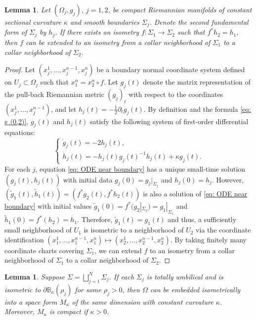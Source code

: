 \documentclass[11pt]{amsart}
\newtheorem{lemma}[theorem]{Lemma}
\theoremstyle{definition}
\numberwithin{equation}{section}
\begin{document}
\begin{lemma}\label{lem: isometric collar}
    Let $(\Omega_j,g_j)$, $j=1,2$,  be compact Riemannian manifolds of constant sectional curvature $\kappa$ and smooth boundaries $\Sigma_j$. Denote the second fundamental form of $\Sigma_j$ by $h_j$. If there exists an isometry $f:\Sigma_1\to\Sigma_2$ such that $f^*h_2 = h_1$, then $f$ can be extended to an isometry from a collar neighborhood of $\Sigma_1$ to a collar neighborhood of $\Sigma_2$.
\end{lemma}
\begin{proof}
    Let $(x_j^1,\dots,x_j^{n-1},x_j^n)$ be a boundary normal coordinate system defined on $U_j\subset\Omega_j$ such that $x_1^\alpha = x_2^\alpha \circ f$.  
    Let $g_j(t)$ denote the matrix representation of the pull-back Riemannian metric $(g_j)_t$ with respect to the coordinates $(x_j^1,\dots,x_j^{n-1})$, and let $h_j(t) = -\frac{1}{2}\partial_tg_j(t)$. By definition and the formula \eqref{eq: g (0,2)}, $g_j(t)$ and $h_j(t)$ satisfy the following system of first-order differential equations:
    \begin{equation}
        \label{eq: ODE near boundary}
        \begin{cases}
            \dot g_j(t) = -2h_j(t),\\
            \dot h_j(t) = -h_j(t)g_j(t)^{-1}h_j(t) + \kappa g_j(t).
        \end{cases}
    \end{equation}
    For each $j$, equation \eqref{eq: ODE near boundary} has a unique small-time solution $(g_j(t),h_j(t))$ with initial data $g_j(0) = g_j|_{\Sigma_j}$ and $h_j(0) = h_j$. However, $(\tilde g_1(t),\tilde h_1(t)) = (f^*g_2(t),f^* h_2(t))$ is also a solution of \eqref{eq: ODE near boundary} with initial values $\tilde g_1(0) = f^*(g_2|_{\Sigma_2}) = g_1|_{\Sigma_1}$ and $\tilde h_1(0) = f^*(h_2) = h_1$. Therefore, $\tilde g_1(t) = g_1(t)$ and thus, a sufficiently small neighborhood of $U_1$ is isometric to a neighborhood of $U_2$ via the coordinate identification   $(x_1^1,\dots,x_1^{n-1},x_1^n)\mapsto (x_2^1,\dots,x_2^{n-1},x_2^n)$. By taking finitely many coordinate charts covering $\Sigma_1$, we can extend $f$ to an isometry from a collar neighborhood of $\Sigma_1$ to a collar neighborhood of $\Sigma_2$.
\end{proof}
\begin{lemma}\label{lem: embed into space form} 
    Suppose $\Sigma = \bigsqcup_{j=1}^N\Sigma_j$. If each $\Sigma_j$ is totally umbilical and is isometric to $\partial\mathbb B_\kappa(\rho_j)$ for some $\rho_j>0$, then $\Omega$ can be embedded isometrically into a space form $M_\kappa$ of the same dimension with constant curvature $\kappa$. Moreover, $M_\kappa$ is compact if $\kappa > 0$.
\end{lemma}
\end{document}
